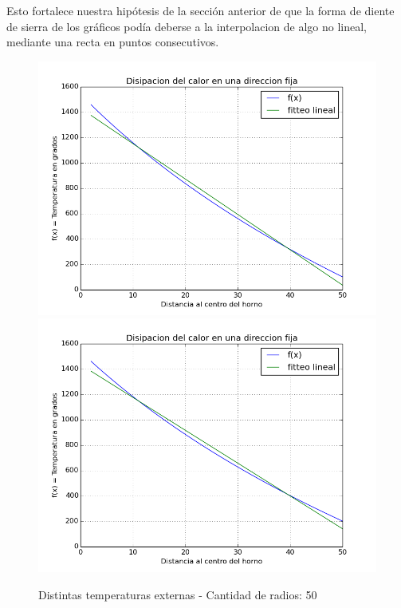 Esto fortalece nuestra hipótesis de la sección anterior de que la forma de diente de sierra de los gráficos podía deberse a la interpolacion de algo no lineal, mediante una recta en puntos consecutivos.

\begin{figure}[h]
\centering
\includegraphics[scale=0.34]{funcion_temp_50_radios_ti_1500_te_102.png}
\includegraphics[scale=0.34]{funcion_temp_50_radios_ti_1500_te_202.png}
\caption{Distintas temperaturas externas - Cantidad de radios: 50}
\end{figure}
\FloatBarrier

